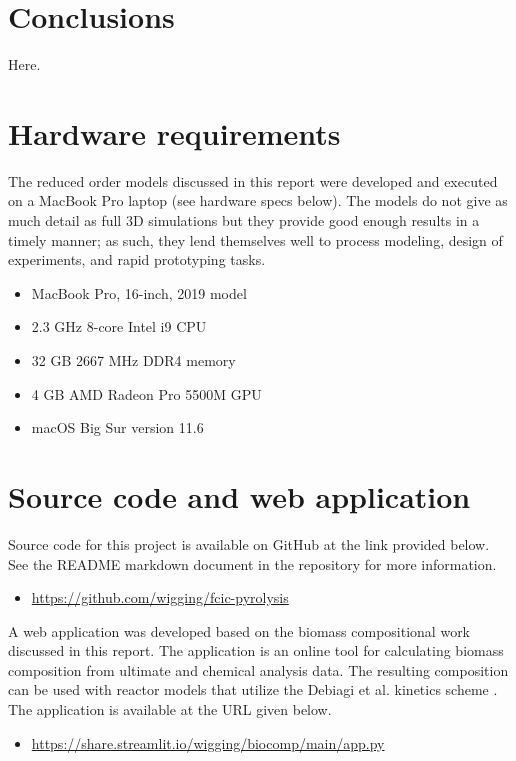 
\section{Conclusions}

Here.

\section{Hardware requirements}

The reduced order models discussed in this report were developed and executed on a MacBook Pro laptop (see hardware specs below). The models do not give as much detail as full 3D simulations but they provide good enough results in a timely manner; as such, they lend themselves well to process modeling, design of experiments, and rapid prototyping tasks.

\begin{itemize}
    \item MacBook Pro, 16-inch, 2019 model
    \item 2.3 GHz 8-core Intel i9 CPU
    \item 32 GB 2667 MHz DDR4 memory
    \item 4 GB AMD Radeon Pro 5500M GPU
    \item macOS Big Sur version 11.6
\end{itemize}

\section{Source code and web application}

Source code for this project is available on GitHub at the link provided below. See the README markdown document in the repository for more information.

\begin{itemize}
    \item \url{https://github.com/wigging/fcic-pyrolysis}
\end{itemize}

A web application was developed based on the biomass compositional work discussed in this report. The application is an online tool for calculating biomass composition from ultimate and chemical analysis data. The resulting composition can be used with reactor models that utilize the Debiagi et al. kinetics scheme \cite{Debiagi-2018}. The application is available at the URL given below.

\begin{itemize}
    \item \url{https://share.streamlit.io/wigging/biocomp/main/app.py}
\end{itemize}
